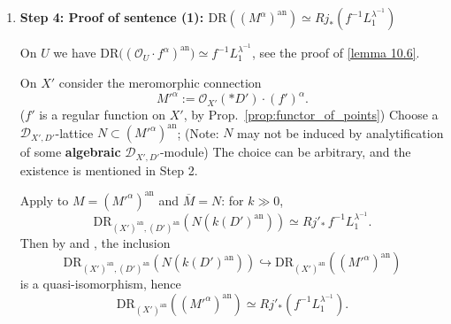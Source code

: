 \begin{remark}
\begin{enumerate}
              \begin{theorem}
                  Let $X$ be a smooth complex analytic variety of dimension $n$ and $D \subset X$ a free divisor ($=$ hypersurface),
                  i.e., a divisor such that the sheaf $\mathrm{Der}(\log D)$ of logarithmic vector fields with respect to $D$ is a locally free $\mathcal{O}_X$-module (of rank $n$).

                  Normal crossing divisors is an example of free divisors.

                  Under the preceding hypotheses, for an analytic integrable logarithmic connection $\mathcal{E}$ with local system $L$, the following properties are equivalent:
                  \begin{enumerate}
                      \item The canonical morphism $\Omega_X^\bullet(\log D)(\mathcal{E}) \to Rj_*L$ is an isomorphism in the derived category.
                      \item The inclusion $\Omega_X^\bullet(\log D)(\mathcal{E}) \hookrightarrow \Omega_X^\bullet(\mathcal{E}(\star D))$ is a quasi-isomorphism.
                  \end{enumerate}
              \end{theorem}

        \item \textbf{Step 4: Proof of sentence (1): $\mathrm{DR}((M^\alpha)^\mathrm{an})\simeq Rj_*(f^{-1}L_1^{\lambda^{-1}})$}

              On $U$ we have $\mathrm{DR}\big((\mathcal O_U\cdot f^\alpha)^\mathrm{an}\big)\simeq f^{-1}L_1^{\lambda^{-1}}$, see the proof of \ref{lemma 10.6}.

              On $X'$ consider the meromorphic connection
              \[
                  M'^\alpha := \mathcal O_{X'}(*D')\cdot (f')^\alpha .
              \]
              ($f'$ is a regular function on $X'$, by Prop.~\ref{prop:functor_of_points})
              Choose a $\mathcal D_{X',D'}$-lattice $N \subset (M'^\alpha)^\mathrm{an}$;
              (Note: $N$ may not be induced by analytification of some \textbf{algebraic} $\mathcal D_{X',D'}$-module)
              The choice can be arbitrary, and the existence is mentioned in Step 2.

              Apply \cite[Thm.~1.2]{Wu2021CharacteristicCyclesHolonomicDmodules} to $M=(M'^\alpha)^\mathrm{an}$ and $\overline M=N$:
              for $k\gg 0$,
              \[
                  \mathrm{DR}_{(X')^\mathrm{an},(D')^\mathrm{an}}(N(k(D')^\mathrm{an})) \simeq Rj'_*\, f^{-1}L_1^{\lambda^{-1}} .
              \]
              Then by \cite[Thm.~4.1]{CalderonMorenoNarvaezMacarro2005Dualite} and \cite[Thm~4.2.4]{hotta2008d}, the inclusion
              \[
                  \mathrm{DR}_{(X')^\mathrm{an},(D')^\mathrm{an}}(N(k(D')^\mathrm{an}))\hookrightarrow \mathrm{DR}_{(X')^\mathrm{an}}((M'^\alpha)^\mathrm{an})
              \]
              is a quasi-isomorphism, hence
              \[
                  \mathrm{DR}_{(X')^\mathrm{an}}((M'^\alpha)^\mathrm{an})\simeq Rj'_*(f^{-1}L_1^{\lambda^{-1}}).
              \]


\end{enumerate}
\end{remark}
